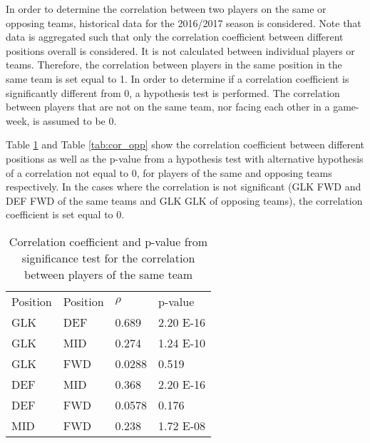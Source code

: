 In order to determine the correlation between two players on the same or opposing teams, historical data for the 2016/2017 season is considered. Note that data is aggregated such that only the correlation coefficient between different positions overall is considered. It is not calculated between individual players or teams. Therefore, the correlation between players in the same position in the same team is set equal to 1. In order to determine if a correlation coefficient is significantly different from 0, a hypothesis test is performed. The correlation between players that are not on the same team, nor facing each other in a game-week, is assumed to be 0.\newpar

Table \ref{tab:cor_team} and Table \ref{tab:cor_opp} show the correlation coefficient between different positions as well as the p-value from a hypothesis test with alternative hypothesis of a correlation not equal to 0, for players of the same and opposing teams respectively. In the cases where the correlation is not significant (GLK FWD and DEF FWD of the same teams and GLK GLK of opposing teams), the correlation coefficient is set equal to 0.

\begin{table}[H]
\centering
\caption{Correlation coefficient and p-value from significance test for the correlation between players of the same team}
\label{tab:cor_team}
\begin{tabular}{llll}
Position & Position & $\rho$    & p-value  \\
GLK      & DEF      & 0.689  & 2.20 E-16 \\
GLK      & MID      & 0.274  & 1.24 E-10 \\
GLK      & FWD      & 0.0288 & 0.519    \\
DEF      & MID      & 0.368  & 2.20 E-16 \\
DEF      & FWD      & 0.0578 & 0.176    \\
MID      & FWD      & 0.238  & 1.72 E-08
\end{tabular}
\end{table}

